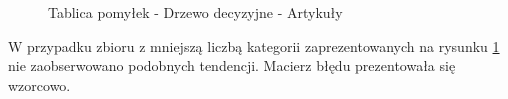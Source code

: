 \begin{figure}[ht!]
	\centering
    \qquad
	\caption{Tablica pomyłek - Drzewo decyzyjne - Artykuły}
    \label{fig:c-matrix-naivebayes-articles}
\end{figure}

W przypadku zbioru z mniejszą liczbą kategorii zaprezentowanych na rysunku \ref{fig:c-matrix-naivebayes-articles} nie zaobserwowano podobnych tendencji. Macierz błędu prezentowała się wzorcowo.


